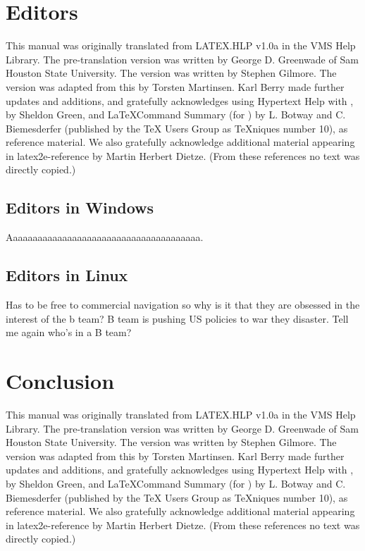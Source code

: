 \documentclass{article}
\begin{document}
	\section{Editors}
		This manual was originally translated from LATEX.HLP v1.0a in the VMS Help Library.  The pre-translation version was written by George D. Greenwade of Sam Houston State University.  The  version was written by Stephen Gilmore.  The \LaTeXe version was adapted from this by Torsten Martinsen.  Karl Berry made further updates and additions, and gratefully acknowledges using Hypertext Help with \LaTeXe, by Sheldon Green, and \LaTeX Command Summary (for ) by L. Botway and C. Biemesderfer (published by the TeX Users Group as TeXniques number 10), as reference material.  We also gratefully acknowledge additional material appearing in latex2e-reference by Martin Herbert Dietze.  (From these references no text was directly copied.)
	
	\subsection{Editors in Windows}
		Aaaaaaaaaaaaaaaaaaaaaaaaaaaaaaaaaaaaaaa.
	
	\subsection{Editors in Linux}
		Has to be free to commercial navigation so why is it that they are obsessed in the interest of the b team? B team is pushing US policies to war they disaster. Tell me again who's in a B team?
	
	\section{Conclusion}
		This manual was originally translated from LATEX.HLP v1.0a in the VMS Help Library.  The pre-translation version was written by George D. Greenwade of Sam Houston State University.  The  version was written by Stephen Gilmore.  The \LaTeXe version was adapted from this by Torsten Martinsen.  Karl Berry made further updates and additions, and gratefully acknowledges using Hypertext Help with \LaTeXe, by Sheldon Green, and \LaTeX Command Summary (for ) by L. Botway and C. Biemesderfer (published by the TeX Users Group as TeXniques number 10), as reference material.  We also gratefully acknowledge additional material appearing in latex2e-reference by Martin Herbert Dietze.  (From these references no text was directly copied.)
	
\end{document}
